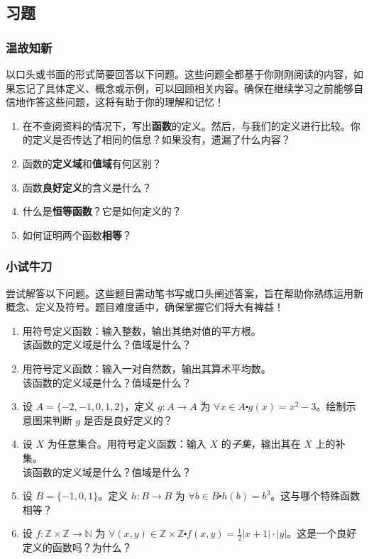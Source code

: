 
\subsection{习题}

\subsubsection*{温故知新}

以口头或书面的形式简要回答以下问题。这些问题全都基于你刚刚阅读的内容，如果忘记了具体定义、概念或示例，可以回顾相关内容。确保在继续学习之前能够自信地作答这些问题，这将有助于你的理解和记忆！

\begin{enumerate}[label=(\arabic*)]
    \item 在不查阅资料的情况下，写出\textbf{函数}的定义。然后，与我们的定义进行比较。你的定义是否传达了相同的信息？如果没有，遗漏了什么内容？
    \item 函数的\textbf{定义域}和\textbf{值域}有何区别？
    \item 函数\textbf{良好定义}的含义是什么？
    \item 什么是\textbf{恒等函数}？它是如何定义的？
    \item 如何证明两个函数\textbf{相等}？
\end{enumerate}

\subsubsection*{小试牛刀}

尝试解答以下问题。这些题目需动笔书写或口头阐述答案，旨在帮助你熟练运用新概念、定义及符号。题目难度适中，确保掌握它们将大有裨益！

\begin{enumerate}[label=(\arabic*)]
    \item 用符号定义函数：输入整数，输出其绝对值的平方根。\\
          该函数的定义域是什么？值域是什么？
    \item 用符号定义函数：输入一对自然数，输出其算术平均数。\\
          该函数的定义域是什么？值域是什么？
    \item 设 $A = \{-2, -1, 0, 1, 2\}$，定义 $g : A \to A$ 为 $\forall x \in A \centerdot g(x) = x^2 - 3$。绘制示意图来判断 $g$ 是否是良好定义的？
    \item 设 $X$ 为任意集合。用符号定义函数：输入 $X$ 的\emph{子集}，输出其在 $X$ 上的补集。\\
          该函数的定义域是什么？值域是什么？
    \item 设 $B = \{-1, 0, 1\}$。定义 $h : B \to B$ 为 $\forall b \in B \centerdot h(b) = b^3$。这与哪个特殊函数相等？
    \item 设 $f : \mathbb{Z} \times \mathbb{Z} \to \mathbb{N}$ 为 $\forall (x, y) \in \mathbb{Z} \times \mathbb{Z} \centerdot f(x, y) = \frac{1}{2}|x + 1| \cdot |y|$。这是一个良好定义的函数吗？为什么？
\end{enumerate}